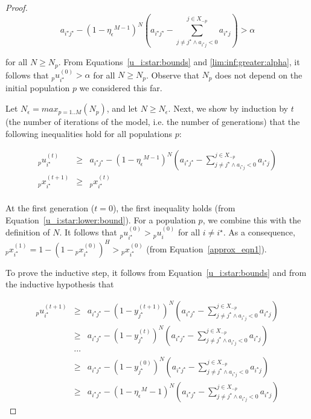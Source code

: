 \documentclass{acm_proc_article-sp}
\begin{document}
\begin{proof}
\begin{equation}
a_{i^\star j^\star} - \left( 1 - {\eta_\epsilon}^{M-1} \right) ^N \left( a_{i^\star j^\star}  - \sum^{j \in X_{-p}}_{j \neq j^\star \wedge a_{i^\star j} < 0} { a_{i^\star j} } \right) > \alpha \label{lim:inf:greater:alpha}
\end{equation}

\noindent for all $N \geq N_p$.  From Equations~\ref{u_i:star:bounds} and \ref{lim:inf:greater:alpha}, it follows that ${_p}u^{(0)}_{i^\star} > \alpha$ for all $N \geq N_p$.  Observe that $N_p$ does not depend on the initial population $p$ we considered this far.

Let $N_\epsilon = max_{p=1..M} \left( N_p \right)$, and let $N \geq N_\epsilon$.  Next, we show by induction by $t$ (the number of iterations of the model, i.e. the number of generations) that the following inequalities hold for all populations $p$:

\begin{eqnarray*}
{_p}u^{(t)}_{i^\star} & \geq & a_{i^\star j^\star} - \left( 1 - {\eta_\epsilon}^{M-1} \right) ^N \left( a_{i^\star j^\star}  - \sum^{j \in X_{-p}}_{j \neq j^\star \wedge a_{i^\star j} < 0} { a_{i^\star j} } \right)\\
{_p}x^{(t+1)}_{i^\star} & \geq & {_p}x^{(t)}_{i^\star}\\
\end{eqnarray*}

At the first generation ($t=0$), the first inequality holds (from Equation~\ref{u_i:star:lower:bound}).  For a population $p$, we combine this with the definition of $N$.  It follows that ${_p}u^{(0)}_{i^\star} > {_p}u^{(0)}_i$ for all $i \neq i^\star$.  As a consequence, ${_p}x^{(1)}_{i^\star} = 1 - \left( 1 - {_p}x^{(0)}_{i^\star} \right)^H > {_p}x^{(0)}_{i^\star}$ (from Equation~\ref{approx_eqn1}).

To prove the inductive step, it follows from Equation~\ref{u_i:star:bounds} and from the inductive hypothesis that 

\noindent\begin{eqnarray*}
{_p}u^{(t+1)}_{i^\star} & \geq & a_{i^\star j^\star} - \left( 1 - y^{(t+1)}_{j^\star} \right) ^N \left( a_{i^\star j^\star}  - \sum^{j \in X_{-p}}_{j \neq j^\star \wedge a_{i^\star j} < 0} { a_{i^\star j} } \right)\\
& \geq & a_{i^\star j^\star} - \left( 1 - y^{(t)}_{j^\star} \right) ^N \left( a_{i^\star j^\star}  - \sum^{j \in X_{-p}}_{j \neq j^\star \wedge a_{i^\star j} < 0} { a_{i^\star j} } \right)\\
& \cdots &\\
& \geq & a_{i^\star j^\star} - \left( 1 - y^{(0)}_{j^\star} \right) ^N \left( a_{i^\star j^\star}  - \sum^{j \in X_{-p}}_{j \neq j^\star \wedge a_{i^\star j} < 0} { a_{i^\star j} } \right)\\
& \geq & a_{i^\star j^\star} - \left( 1 - {\eta_\epsilon}^M-1 \right) ^N \left( a_{i^\star j^\star}  - \sum^{j \in X_{-p}}_{j \neq j^\star \wedge a_{i^\star j} < 0} { a_{i^\star j} } \right)
\end{eqnarray*}


\end{proof}
\end{document}
